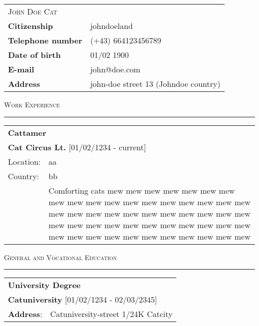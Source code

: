 \documentclass[
	fontsize = 10.0pt,
	a4paper,
	parskip = half*,
	twoside,	%
]{scrartcl}
\makeatletter
\renewcommand{\arraystretch}{1.5}			%
\newcommand\CVname{John Doe Cat}
\newcommand\CVcitizenship{johndoeland}
\newcommand\CVphonenumber{(+43) 664123456789}
\newcommand\CVbirthdate{01/02 1900}
\newcommand\CVmail{john@doe.com}
\newcommand\CVaddress{john-doe street 13 (Johndoe country)}
\makeatother
\begin{document}

	\begin{table}[H]
		\begin{tabular}{ l l }		%
			\multicolumn{2}{l}{{\fontsize{20pt}{17pt}\selectfont\scshape \CVname}}	\\
			\textbf{Citizenship}				&	\CVcitizenship					\\
			\textbf{Telephone number}			&	\CVphonenumber					\\
			\textbf{Date of birth}				&	\CVbirthdate					\\
			\textbf{E-mail}						&	\CVmail							\\
			\textbf{Address}					&	\CVaddress						\\
		\end{tabular}
	\end{table}%


	{\fontsize{20pt}{17pt}\selectfont\scshape Work Experience}
	\vskip 1mm%
	{\color{black!25}\hrule}

	\renewcommand{\arraystretch}{1.25}			%
	\begin{table}[H]
		\begin{tabularx}{\textwidth}{l X}
			\multicolumn{2}{l}{{\fontsize{14pt}{10pt}\selectfont\bfseries Cattamer}}	\\
			\multicolumn{2}{l}{\textbf{Cat Circus Lt.} [01/02/1234 - current]}			\\
			Location:	& aa	\\
			Country:	& bb	\\
			\hspace{1.5mm} & Comforting cats mew mew mew mew mew mew mew mew mew mew mew mew mew mew mew mew mew mew mew mew mew mew mew mew mew mew mew mew mew mew mew mew mew mew mew mew mew mew mew mew mew mew mew mew mew mew mew mew mew mew mew\\
		\end{tabularx}
	\end{table}

	\vspace{5mm}

	{\fontsize{20pt}{17pt}\selectfont\scshape General and Vocational Education}
	\renewcommand{\arraystretch}{1.25}			%
	\vskip 1mm%
	{\color{black!25}\hrule}

	\begin{table}[H]
		\begin{tabularx}{\textwidth}{l X}
			\multicolumn{2}{l}{{\fontsize{14pt}{10pt}\selectfont\bfseries University Degree}}	\\
			\multicolumn{2}{l}{{\fontsize{10pt}{10pt}\selectfont\bfseries Catuniversity} [01/02/1234 - 02/03/2345]}	\\
			{\fontsize{10pt}{10pt}\selectfont\bfseries Address}: &	Catuniversity-street 1/24K Catcity	\\
		\end{tabularx}
	\end{table}
\end{document}
